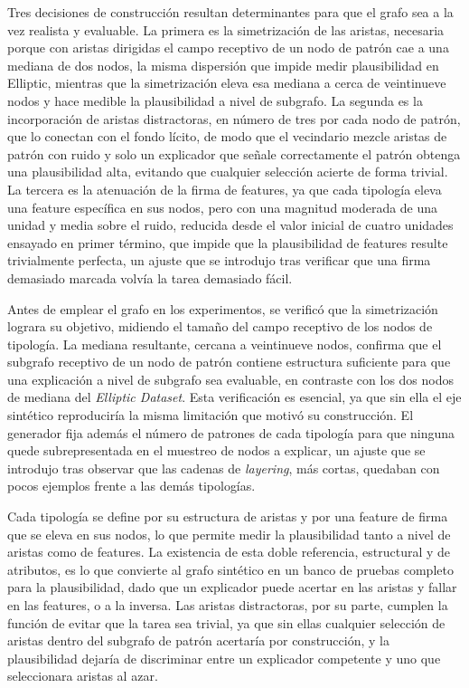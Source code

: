 Tres decisiones de construcción resultan determinantes para que el grafo sea a la vez realista y evaluable. La primera es la simetrización de las aristas, necesaria porque con aristas dirigidas el campo receptivo de un nodo de patrón cae a una mediana de dos nodos, la misma dispersión que impide medir plausibilidad en Elliptic, mientras que la simetrización eleva esa mediana a cerca de veintinueve nodos y hace medible la plausibilidad a nivel de subgrafo. La segunda es la incorporación de aristas distractoras, en número de tres por cada nodo de patrón, que lo conectan con el fondo lícito, de modo que el vecindario mezcle aristas de patrón con ruido y solo un explicador que señale correctamente el patrón obtenga una plausibilidad alta, evitando que cualquier selección acierte de forma trivial. La tercera es la atenuación de la firma de features, ya que cada tipología eleva una feature específica en sus nodos, pero con una magnitud moderada de una unidad y media sobre el ruido, reducida desde el valor inicial de cuatro unidades ensayado en primer término, que impide que la plausibilidad de features resulte trivialmente perfecta, un ajuste que se introdujo tras verificar que una firma demasiado marcada volvía la tarea demasiado fácil.

Antes de emplear el grafo en los experimentos, se verificó que la simetrización lograra su objetivo, midiendo el tamaño del campo receptivo de los nodos de tipología. La mediana resultante, cercana a veintinueve nodos, confirma que el subgrafo receptivo de un nodo de patrón contiene estructura suficiente para que una explicación a nivel de subgrafo sea evaluable, en contraste con los dos nodos de mediana del \textit{Elliptic Dataset}. Esta verificación es esencial, ya que sin ella el eje sintético reproduciría la misma limitación que motivó su construcción. El generador fija además el número de patrones de cada tipología para que ninguna quede subrepresentada en el muestreo de nodos a explicar, un ajuste que se introdujo tras observar que las cadenas de \textit{layering}, más cortas, quedaban con pocos ejemplos frente a las demás tipologías.

Cada tipología se define por su estructura de aristas y por una feature de firma que se eleva en sus nodos, lo que permite medir la plausibilidad tanto a nivel de aristas como de features. La existencia de esta doble referencia, estructural y de atributos, es lo que convierte al grafo sintético en un banco de pruebas completo para la plausibilidad, dado que un explicador puede acertar en las aristas y fallar en las features, o a la inversa. Las aristas distractoras, por su parte, cumplen la función de evitar que la tarea sea trivial, ya que sin ellas cualquier selección de aristas dentro del subgrafo de patrón acertaría por construcción, y la plausibilidad dejaría de discriminar entre un explicador competente y uno que seleccionara aristas al azar.

